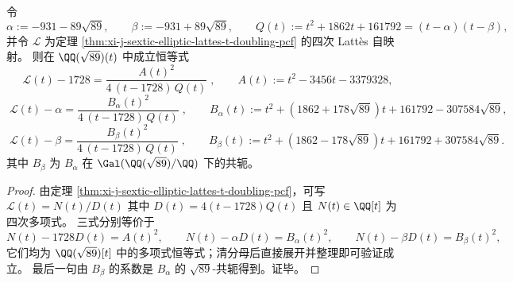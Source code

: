 \begin{theorem}\label{thm:xi-j-sextic-elliptic-lattes-three-branch-square-factorization}
令
\[
\alpha:=-931-89\sqrt{89},\qquad \beta:=-931+89\sqrt{89},
\qquad
Q(t):=t^2+1862t+161792=(t-\alpha)(t-\beta),
\]
并令 \(\mathcal L\) 为定理 \ref{thm:xi-j-sextic-elliptic-lattes-t-doubling-pcf} 的四次 Latt\`es 自映射。
则在 \(\QQ(\sqrt{89})(t)\) 中成立恒等式
\[
\boxed{\;
\mathcal L(t)-1728=\frac{A(t)^2}{4\,(t-1728)\,Q(t)}\;},
\qquad
A(t):=t^2-3456t-3379328,
\]
\[
\boxed{\;
\mathcal L(t)-\alpha=\frac{B_{\alpha}(t)^2}{4\,(t-1728)\,Q(t)}\;},
\qquad
B_{\alpha}(t):=t^2+(1862+178\sqrt{89})t+161792-307584\sqrt{89},
\]
\[
\boxed{\;
\mathcal L(t)-\beta=\frac{B_{\beta}(t)^2}{4\,(t-1728)\,Q(t)}\;},
\qquad
B_{\beta}(t):=t^2+(1862-178\sqrt{89})t+161792+307584\sqrt{89}.
\]
其中 \(B_{\beta}\) 为 \(B_{\alpha}\) 在 \(\Gal(\QQ(\sqrt{89})/\QQ)\) 下的共轭。
\end{theorem}
\begin{proof}
由定理 \ref{thm:xi-j-sextic-elliptic-lattes-t-doubling-pcf}，可写
\(
\mathcal L(t)=N(t)/D(t)
\)
其中
\(
D(t)=4(t-1728)Q(t)
\)
且 \(N(t)\in\QQ[t]\) 为四次多项式。
三式分别等价于
\[
N(t)-1728D(t)=A(t)^2,\qquad
N(t)-\alpha D(t)=B_{\alpha}(t)^2,\qquad
N(t)-\beta D(t)=B_{\beta}(t)^2,
\]
它们均为 \(\QQ(\sqrt{89})[t]\) 中的多项式恒等式；清分母后直接展开并整理即可验证成立。
最后一句由 \(B_{\beta}\) 的系数是 \(B_{\alpha}\) 的 \(\sqrt{89}\)-共轭得到。证毕。
\end{proof}

